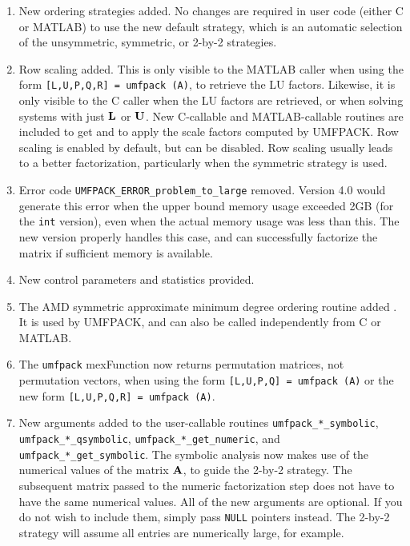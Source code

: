 \documentclass[11pt]{article}
\newcommand{\m}[1]{{\bf{#1}}}       %
\begin{document}
\begin{enumerate}

\item New ordering strategies added.  No changes are required in user code
    (either C or MATLAB) to use the new default strategy, which is an automatic
    selection of the unsymmetric, symmetric, or 2-by-2 strategies.

\item Row scaling added.  This is only visible to the MATLAB caller when using
    the form {\tt [L,U,P,Q,R] = umfpack (A)}, to retrieve the LU factors.
    Likewise, it is only visible to the C caller when the LU factors are
    retrieved, or when solving systems with just $\m{L}$ or $\m{U}$.
    New C-callable and MATLAB-callable routines are included to get and to
    apply the scale factors computed by UMFPACK.  Row scaling is enabled by
    default, but can be disabled.  Row scaling usually leads to a better
    factorization, particularly when the symmetric strategy is used.

\item Error code {\tt UMFPACK\_ERROR\_problem\_to\_large} removed.
    Version 4.0 would generate this error when the upper bound memory usage
    exceeded 2GB (for the {\tt int} version), even when the actual memory
    usage was less than this.  The new version properly handles this case,
    and can successfully factorize the matrix if sufficient memory is
    available.

\item New control parameters and statistics provided.

\item The AMD symmetric approximate minimum degree ordering routine added
    \cite{AmestoyDavisDuff96,AmestoyDavisDuff03}.
    It is used by UMFPACK, and can also be called independently from C or
    MATLAB.

\item The {\tt umfpack} mexFunction now returns permutation matrices, not
    permutation vectors, when using the form {\tt [L,U,P,Q] = umfpack (A)}
    or the new form {\tt [L,U,P,Q,R] = umfpack (A)}.

\item New arguments added to the user-callable routines
    {\tt umfpack\_*\_symbolic},
    {\tt umfpack\_*\_qsymbolic},
    {\tt umfpack\_*\_get\_numeric}, and
    {\tt umfpack\_*\_get\_symbolic}.
    The symbolic analysis now makes use of the numerical values of the matrix
    $\m{A}$, to guide the 2-by-2 strategy.  The subsequent matrix passed to
    the numeric factorization step does not have to have the same numerical
    values.  All of the new arguments are optional.  If you do not wish to
    include them, simply pass {\tt NULL} pointers instead.  The 2-by-2 strategy
    will assume all entries are numerically large, for example.


\end{enumerate}
\end{document}
